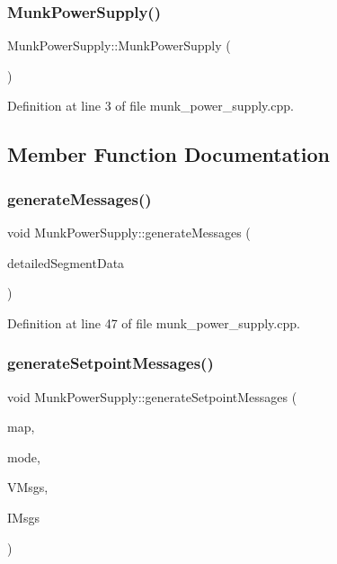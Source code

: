 \subsubsection{Munk\+Power\+Supply()}
{\footnotesize\ttfamily Munk\+Power\+Supply\+::\+Munk\+Power\+Supply (\begin{DoxyParamCaption}{ }\end{DoxyParamCaption})}



Definition at line 3 of file munk\+\_\+power\+\_\+supply.\+cpp.



\subsection{Member Function Documentation}
\mbox{\label{class_munk_power_supply_a93fa50a726abc272287a88f4bec1cc64}} 
\subsubsection{generate\+Messages()}
{\footnotesize\ttfamily void Munk\+Power\+Supply\+::generate\+Messages (\begin{DoxyParamCaption}\item[{const \textbf{ Data\+Parameter\+::\+Segment\+Time\+Detailed} \&}]{detailed\+Segment\+Data }\end{DoxyParamCaption})}



Definition at line 47 of file munk\+\_\+power\+\_\+supply.\+cpp.

\mbox{\label{class_munk_power_supply_ae24804f05e23d9c3549fe1e2fe149429}} 
\subsubsection{generate\+Setpoint\+Messages()}
{\footnotesize\ttfamily void Munk\+Power\+Supply\+::generate\+Setpoint\+Messages (\begin{DoxyParamCaption}\item[{const std\+::map$<$ \textbf{ Data\+::\+Register\+Data\+Object}, \textbf{ Data\+::\+Segment\+Level} $>$ \&}]{map,  }\item[{const \textbf{ Data\+::\+Segment\+Mode} \&}]{mode,  }\item[{std\+::vector$<$ \textbf{ Data\+Parameter\+::\+Segment\+Voltage\+Setpoint} $>$ \&}]{V\+Msgs,  }\item[{std\+::vector$<$ \textbf{ Data\+Parameter\+::\+Segment\+Current\+Setpoint} $>$ \&}]{I\+Msgs }\end{DoxyParamCaption})\hspace{0.3cm}{\ttfamily [private]}}



